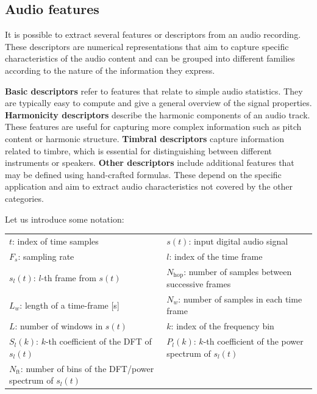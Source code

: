 \clearpage

\subsection{Audio features}
It is possible to extract several features or descriptors from an audio recording.
These descriptors are numerical representations that aim to capture specific characteristics of the audio content and can be grouped into different families according to the nature of the information they express.

\textbf{Basic descriptors} refer to features that relate to simple audio statistics.
They are typically easy to compute and give a general overview of the signal properties.
\textbf{Harmonicity descriptors} describe the harmonic components of an audio track.
These features are useful for capturing more complex information such as pitch content or harmonic structure.
\textbf{Timbral descriptors} capture information related to timbre, which is essential for distinguishing between different instruments or speakers.
\textbf{Other descriptors} include additional features that may be defined using hand-crafted formulas.
These depend on the specific application and aim to extract audio characteristics not covered by the other categories.

Let us introduce some notation:

\begin{center}
    \begin{tabular}{ll}
        $t$: index of time samples &
        $s(t)$: input digital audio signal \\
        $F_s$: sampling rate &
        $l$: index of the time frame \\
        $s_l(t)$: $l$-th frame from $s(t)$ &
        $N_\text{hop}$: number of samples between successive frames \\
        $L_w$: length of a time-frame [s] &
        $N_w$: number of samples in each time frame \\
        $L$: number of windows in $s(t)$ &
        $k$: index of the frequency bin \\
        $S_l(k)$: $k$-th coefficient of the DFT of $s_l(t)$ &
        $P_l(k)$: $k$-th coefficient of the power spectrum of $s_l(t)$ \\
        $N_\text{ft}$: number of bins of the DFT/power spectrum of $s_l(t)$ & \\
    \end{tabular}
\end{center}


